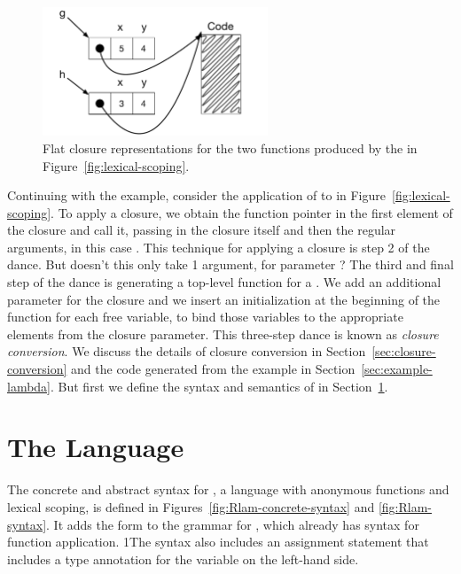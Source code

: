 \documentclass[7x10,nocrop]{TimesAPriori_MIT}%
\def\pythonEd{1}
\def\edition{1}
\newcommand{\python}[1]{{\if\edition\pythonEd #1\fi}}
\begin{document}
\begin{figure}[tbp]
\centering \includegraphics[width=0.6\textwidth]{figs/closures}
\caption{Flat closure representations for the two functions
  produced by the  in Figure~\ref{fig:lexical-scoping}.}
\label{fig:closures}
\end{figure}

Continuing with the example, consider the application of  to
 in Figure~\ref{fig:lexical-scoping}.  To apply a closure, we
obtain the function pointer in the first element of the closure and
call it, passing in the closure itself and then the regular arguments,
in this case . This technique for applying a closure is step
2 of the dance.
%
But doesn't this  only take 1 argument, for parameter
? The third and final step of the dance is generating a
top-level function for a .  We add an additional
parameter for the closure and we insert an initialization at the beginning
of the function for each free variable, to bind those variables to the
appropriate elements from the closure parameter.
%
This three-step dance is known as \emph{closure conversion}.  We
discuss the details of closure conversion in
Section~\ref{sec:closure-conversion} and the code generated from the
example in Section~\ref{sec:example-lambda}. But first we define the
syntax and semantics of \LangLam{} in Section~\ref{sec:r5}.

\section{The \LangLam{} Language}
\label{sec:r5}

The concrete and abstract syntax for \LangLam{}, a language with anonymous
functions and lexical scoping, is defined in
Figures~\ref{fig:Rlam-concrete-syntax} and \ref{fig:Rlam-syntax}. It adds
the  form to the grammar for \LangFun{}, which already has
syntax for function application.
\python{The syntax also includes an assignment statement that includes
a type annotation for the variable on the left-hand side.}
\end{document}
